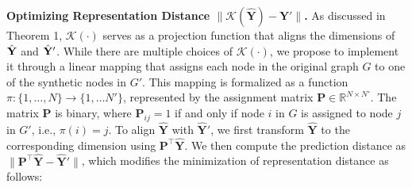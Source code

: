 \textbf{Optimizing Representation Distance $ \| \mathcal{K}(\hat{\mathbf{Y}}) - \hat{\mathbf{Y}}' \|$.} As discussed in Theorem 1, $\mathcal{K}(\cdot)$ serves as a projection function that aligns the dimensions of $\hat{\bf Y}$ and $\hat{\bf Y}'$. While there are multiple choices of $\mathcal{K}(\cdot)$, we propose to implement it through a linear mapping that assigns each node in the original graph $G$ to one of the synthetic nodes in $G'$. This mapping is formalized as a function $\pi:\{1,\ldots,N\}\to\{1,\ldots N'\}$, represented by the assignment matrix $\mathbf{P} \in \mathbb{R}^{N \times N'}$. The matrix $\mathbf{P}$ is binary, where $\mathbf{P}_{ij} = 1$ if and only if node $i$ in $G$ is assigned to node $j$ in $G'$, i.e., $\pi(i) = j$.  To align $\hat{\mathbf{Y}}$ with $\hat{\mathbf{Y}}'$, we first transform $\hat{\mathbf{Y}}$ to the corresponding dimension using $\mathbf{P}^\top\hat{\mathbf{Y}}$. We then compute the prediction distance as $\|\mathbf{P}^\top \hat{\mathbf{Y}} - \hat{\mathbf{Y}}'\|$, which modifies the minimization of representation distance as  follows:

